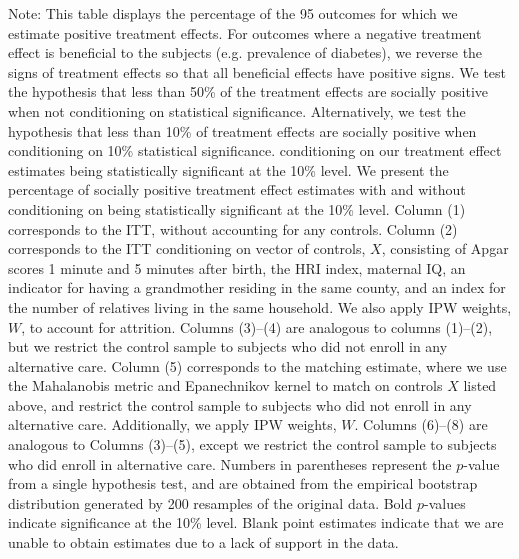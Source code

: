 \begin{sidewaystable}[H]
\begin{threeparttable}
\begin{tabular}{ccccccccc}
  \bottomrule
  \end{tabular}

    \begin{tablenotes}
    \footnotesize
    \item 
Note: This table displays the percentage of the 95 outcomes for which we estimate positive
treatment effects. For outcomes where a negative treatment effect is beneficial to the subjects
(e.g. prevalence of diabetes), we reverse the signs of treatment effects so that all beneficial 
effects have positive signs.
We test the hypothesis that less than 50\% of the treatment effects are socially positive when not
conditioning on statistical significance. Alternatively, we test the hypothesis that less than 10\% 
of treatment effects are socially positive when conditioning on 10\% statistical significance.
conditioning on our treatment effect estimates being statistically significant at the 10\% level.
We present the percentage of socially positive treatment effect estimates
with and without conditioning on being statistically significant at the 10\% level.
Column (1) corresponds to the ITT, without accounting for any controls.
Column (2) corresponds to the ITT conditioning on vector of controls, $X$, consisting of Apgar scores 1 minute and 5 minutes after birth, the HRI index, maternal IQ,
an indicator for having a grandmother residing in the same county, and an index for the number
of relatives living in the same household. We also apply IPW weights, $W$, to account for attrition.
Columns (3)--(4) are analogous to columns (1)--(2), but we restrict the control sample to subjects
who did not enroll in any alternative care.
Column (5) corresponds to the matching estimate, where we use the Mahalanobis metric and Epanechnikov kernel
to match on controls $X$ listed above, and restrict the control sample to subjects who did not enroll
in any alternative care. Additionally, we apply IPW weights, $W$.
Columns (6)--(8) are analogous to Columns (3)--(5), except we restrict the control sample to subjects
who did enroll in alternative care. 
Numbers in parentheses represent the $p$-value from a single hypothesis test, and are obtained from 
the empirical bootstrap distribution generated by 200 resamples of the original data. 
Bold $p$-values indicate significance at the 10\% level. Blank point estimates indicate that
we are unable to obtain estimates due to a lack of support in the data. 

    \end{tablenotes}
  \end{threeparttable}
\end{sidewaystable}